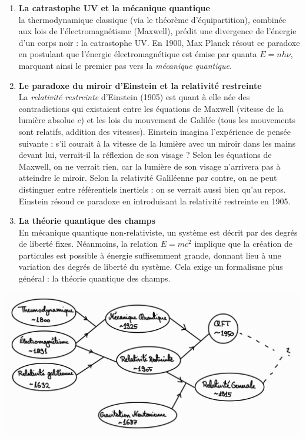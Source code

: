\begin{enumerate}
    \item \textbf{La catrastophe UV et la mécanique quantique}\\ 
    la thermodynamique classique (via le théorème d'équipartition), combinée aux lois de l'électromagnétisme (Maxwell), prédit une divergence de l'énergie d'un corps noir : la catrastophe UV. En 1900, Max Planck résout ce paradoxe en postulant que l'énergie électromagnétique est émise par quanta $E = n h \nu$, marquant ainsi le premier pas vers la \emph{mécanique quantique}.\\
    \item \textbf{Le paradoxe du miroir d'Einstein et la relativité restreinte}\\
    La \emph{relativité restreinte} d'Einstein (1905) est quant à elle née des contradictions qui existaient entre les équations de Maxwell (vitesse de la lumière absolue $c$) et les lois du mouvement de Galilée (tous les mouvements sont relatifs, addition des vitesses). Einstein imagina l'expérience de pensée suivante : s'il courait à la vitesse de la lumière avec un miroir dans les mains devant lui, verrait-il la réflexion de son visage ? Selon les équations de Maxwell, on ne verrait rien, car la lumière de son visage n'arrivera pas à atteindre le miroir. Selon la relativité Galiléenne par contre, on ne peut distinguer entre référentiels inertiels : on se verrait aussi bien qu'au repos. Einstein résoud ce paradoxe en introduisant la relativité restreinte en 1905.\\
    \item \textbf{La théorie quantique des champs}\\
    En mécanique quantique non-relativiste, un système est décrit par des degrés de liberté fixes. Néanmoins, la relation $E=mc^2$ implique que la création de particules est possible à énergie suffisemment grande, donnant lieu à une variation des degrés de liberté du système. Cela exige un formalisme plus général : la théorie quantique des champs.
\end{enumerate}
\begin{center}
    \includegraphics[scale=0.2]{Chapitres/1. Introduction/Images/Contradictions temp.png}
\end{center}
